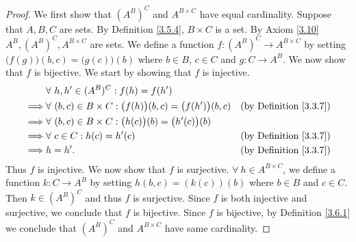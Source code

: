 \begin{proof}
    We first show that \((A^B)^C\) and \(A^{B \times C}\) have equal cardinality.
    Suppose that \(A, B, C\) are sets.
    By Definition \ref{3.5.4}, \(B \times C\) is a set.
    By Axiom \ref{3.10} \(A^B, (A^B)^C, A^{B \times C}\) are sets.
    We define a function \(f : (A^B)^C \to A^{B \times C}\) by setting \(\big(f(g)\big)(b, c) = \big(g(c)\big)(b)\) where \(b \in B\), \(c \in C\) and \(g : C \to A^B\).
    We now show that \(f\) is bijective.
    We start by showing that \(f\) is injective.
    \begin{align*}
                 & \forall\ h, h' \in (A^B)^C : f(h) = f(h')                                                                          \\
        \implies & \forall\ (b, c) \in B \times C : \big(f(h)\big)(b, c) = \big(f(h')\big)(b, c) & \text{(by Definition \ref{3.3.7})} \\
        \implies & \forall\ (b, c) \in B \times C : \big(h(c)\big)(b) = \big(h'(c)\big)(b)                                            \\
        \implies & \forall\ c \in C : h(c) = h'(c)                                               & \text{(by Definition \ref{3.3.7})} \\
        \implies & h = h'.                                                                       & \text{(by Definition \ref{3.3.7})}
    \end{align*}
    Thus \(f\) is injective.
    We now show that \(f\) is surjective.
    \(\forall\ h \in A^{B \times C}\), we define a function \(k : C \to A^B\) by setting \(h(b, c) = (k(c))(b)\) where \(b \in B\) and \(c \in C\).
    Then \(k \in (A^B)^C\) and thus \(f\) is surjective.
    Since \(f\) is both injective and surjective, we conclude that \(f\) is bijective.
    Since \(f\) is bijective, by Definition \ref{3.6.1} we conclude that \((A^B)^C\) and \(A^{B \times C}\) have same cardinality.


\end{proof}
